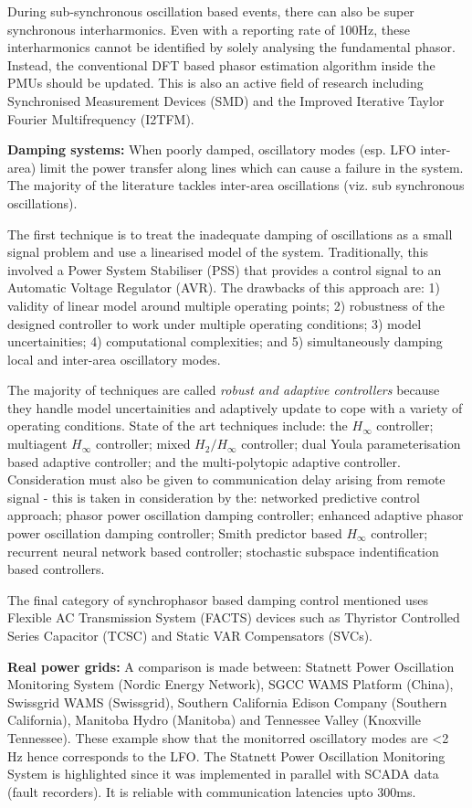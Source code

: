 \documentclass[12pt, a4paper]{report}
\begin{document}
During sub-synchronous oscillation based events, there can also be super synchronous interharmonics. Even with a reporting rate of 100Hz, these interharmonics cannot be identified by solely analysing the fundamental phasor. Instead, the conventional DFT based phasor estimation algorithm inside the PMUs should be updated. This is also an active field of research including Synchronised Measurement Devices (SMD) and the Improved Iterative Taylor Fourier Multifrequency (I2TFM).\par
\textbf{Damping systems:} When poorly damped, oscillatory modes (esp. LFO inter-area) limit the power transfer along lines which can cause a failure in the system. The majority of the literature tackles inter-area oscillations (viz. sub synchronous oscillations).\par
The first technique is to treat the inadequate damping of oscillations as a small signal problem and use a linearised model of the system. Traditionally, this involved a Power System Stabiliser (PSS) that provides a control signal to an Automatic Voltage Regulator (AVR). The drawbacks of this approach are: 1) validity of linear model around multiple operating points; 2) robustness of the designed controller to work under multiple operating conditions; 3) model uncertainities; 4) computational complexities; and 5) simultaneously damping local and inter-area oscillatory modes.\par
The majority of techniques are called \emph{robust and adaptive controllers} because they handle model uncertainities and adaptively update to cope with a variety of operating conditions. State of the art techniques include: the $H_\infty$ controller; multiagent $H_\infty$ controller; mixed $H_2/H_\infty$ controller; dual Youla parameterisation based adaptive controller; and the multi-polytopic adaptive controller. Consideration must also be given to communication delay arising from remote signal - this is taken in consideration by the: networked predictive control approach; phasor power oscillation damping controller; enhanced adaptive phasor power oscillation damping controller; Smith predictor based $H_\infty$ controller; recurrent neural network based controller; stochastic subspace indentification based controllers.\par
The final category of synchrophasor based damping control mentioned uses Flexible AC Transmission System (FACTS) devices such as Thyristor Controlled Series Capacitor (TCSC) and Static VAR Compensators (SVCs).\par
\textbf{Real power grids:} A comparison is made between: Statnett Power Oscillation Monitoring System (Nordic Energy Network), SGCC WAMS Platform (China), Swissgrid WAMS (Swissgrid), Southern California Edison Company (Southern California), Manitoba Hydro (Manitoba) and Tennessee Valley (Knoxville Tennessee). These example show that the monitorred oscillatory modes are \textless 2 Hz hence corresponds to the LFO. The Statnett Power Oscillation Monitoring System is highlighted since it was implemented in parallel with SCADA data (fault recorders). It is reliable with communication latencies upto 300ms.\par
\end{document}
